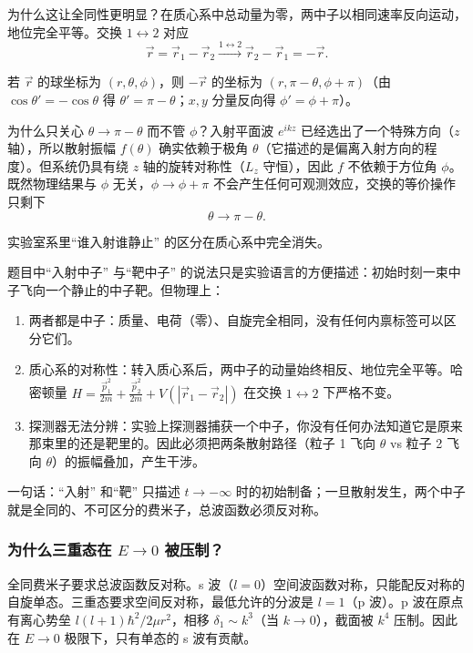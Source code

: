 \begin{derivationbox}
为什么这让全同性更明显？在质心系中总动量为零，两中子以相同速率反向运动，地位完全平等。交换 $1 \leftrightarrow 2$ 对应
\[
\vec{r} = \vec{r}_1 - \vec{r}_2 \xrightarrow{1\leftrightarrow 2} \vec{r}_2 - \vec{r}_1 = -\vec{r}.
\]

若 $\vec{r}$ 的球坐标为 $(r, \theta, \phi)$，则 $-\vec{r}$ 的坐标为 $(r, \pi - \theta, \phi + \pi)$（由 $\cos\theta' = -\cos\theta$ 得 $\theta' = \pi - \theta$；$x, y$ 分量反向得 $\phi' = \phi + \pi$）。

为什么只关心 $\theta \to \pi - \theta$ 而不管 $\phi$？入射平面波 $e^{ikz}$ 已经选出了一个特殊方向（$z$ 轴），所以散射振幅 $f(\theta)$ 确实依赖于极角 $\theta$（它描述的是偏离入射方向的程度）。但系统仍具有绕 $z$ 轴的旋转对称性（$L_z$ 守恒），因此 $f$ 不依赖于方位角 $\phi$。既然物理结果与 $\phi$ 无关，$\phi \to \phi + \pi$ 不会产生任何可观测效应，交换的等价操作只剩下
\[
\theta \longrightarrow \pi - \theta.
\]

实验室系里``谁入射谁静止'' 的区分在质心系中完全消失。
\end{derivationbox}

\begin{insightbox}
题目中``入射中子'' 与``靶中子'' 的说法只是实验语言的方便描述：初始时刻一束中子飞向一个静止的中子靶。但物理上：
\begin{enumerate}
    \item 两者都是中子：质量、电荷（零）、自旋完全相同，没有任何内禀标签可以区分它们。
    \item 质心系的对称性：转入质心系后，两中子的动量始终相反、地位完全平等。哈密顿量 $H = \frac{\vec{p}_1^2}{2m} + \frac{\vec{p}_2^2}{2m} + V(|\vec{r}_1 - \vec{r}_2|)$ 在交换 $1 \leftrightarrow 2$ 下严格不变。
    \item 探测器无法分辨：实验上探测器捕获一个中子，你没有任何办法知道它是原来那束里的还是靶里的。因此必须把两条散射路径（粒子 1 飞向 $\theta$ vs 粒子 2 飞向 $\theta$）的振幅叠加，产生干涉。
\end{enumerate}

一句话：``入射'' 和``靶'' 只描述 $t \to -\infty$ 时的初始制备；一旦散射发生，两个中子就是全同的、不可区分的费米子，总波函数必须反对称。
\end{insightbox}

\subsubsection*{为什么三重态在 $E \to 0$ 被压制？}

全同费米子要求总波函数反对称。s 波（$l = 0$）空间波函数对称，只能配反对称的自旋单态。三重态要求空间反对称，最低允许的分波是 $l = 1$（p 波）。p 波在原点有离心势垒 $l(l+1)\hbar^2/2\mu r^2$，相移 $\delta_1 \sim k^3$（当 $k \to 0$），截面被 $k^4$ 压制。因此在 $E \to 0$ 极限下，只有单态的 s 波有贡献。

